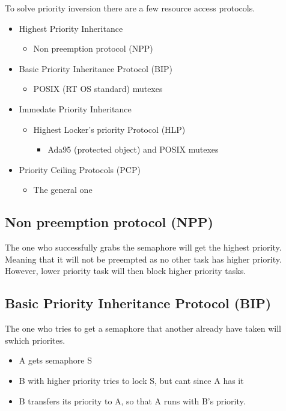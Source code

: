 To solve priority inversion there are a few resource access protocols.
\begin{itemize}
  \item Highest Priority Inheritance
  \begin{itemize}
    \item Non preemption protocol (NPP)
  \end{itemize}
  \item Basic Priority Inheritance Protocol (BIP)
  \begin{itemize}
    \item POSIX (RT OS standard) mutexes
  \end{itemize}
  \item Immedate Priority Inheritance
  \begin{itemize}
    \item Highest Locker's priority Protocol (HLP)
    \begin{itemize}
      \item Ada95 (protected object) and POSIX mutexes
    \end{itemize}
  \end{itemize}
  \item Priority Ceiling Protocols (PCP)
  \begin{itemize}
    \item The general one
  \end{itemize}
\end{itemize}


\subsection{Non preemption protocol (NPP)}
The one who successfully grabs the semaphore will get the highest priority.
Meaning that it will not be preempted as no other task has higher priority.
However, lower priority task will then block higher priority tasks.



\subsection{Basic Priority Inheritance Protocol (BIP)}
The one who tries to get a semaphore that another already have taken will swhich priorites.

\begin{itemize}
  \item A gets semaphore S
  \item B with higher priority tries to lock S, but cant since A has it
  \item B transfers its priority to A, so that A runs with B's priority.
\end{itemize}

